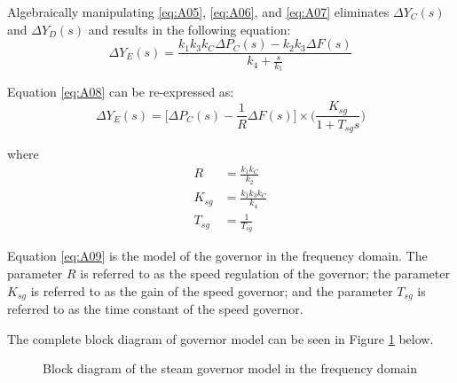 Algebraically manipulating \ref{eq:A05}, \ref{eq:A06}, and \ref{eq:A07} eliminates $\Delta Y_C(s)$ and $\Delta Y_D(s)$ and results in the following equation:
\begin{equation}
	\Delta Y_E(s) = \frac{k_1 k_3 k_C \Delta P_C(s) - k_2 k_3 \Delta F(s)}{k_4 + \frac{s}{k_5}} \label{eq:A08}
\end{equation}

Equation \ref{eq:A08} can be re-expressed as:
\begin{equation}
	\Delta Y_E(s) = \bigg[ \Delta P_C(s) - \frac{1}{R} \Delta F(s) \bigg] \times \bigg( \frac{K_{sg}}{1 + T_{sg}s} \bigg) \label{eq:A09}
\end{equation}

where
\begin{align}
	R &= \frac{k_1 k_C}{k_2} \\
	K_{sg} &= \frac{k_1 k_3 k_C}{k_4} \\
	T_{sg} &= \frac{1}{T_{sg}} 
\end{align}

Equation \ref{eq:A09} is the model of the governor in the frequency domain. The parameter $R$ is referred to as the speed regulation of the governor; the parameter $K_{sg}$ is referred to as the gain of the speed governor; and the parameter $T_{sg}$ is referred to as the time constant of the speed governor.

The complete block diagram of governor model can be seen in Figure \ref{fig:A02_governor_model} below.

\begin{figure}[h]
	\centering
	
	\caption{Block diagram of the steam governor model in the frequency domain}
	\label{fig:A02_governor_model}
\end{figure}